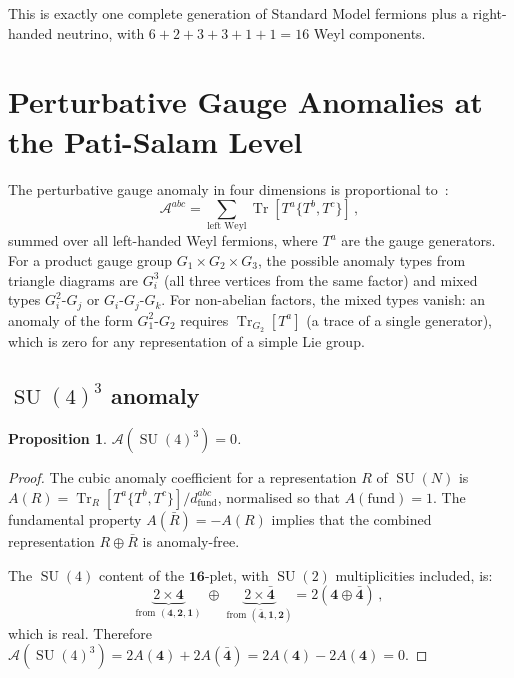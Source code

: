 \documentclass[12pt,a4paper]{article}
\newtheorem{proposition}[theorem]{Proposition}
\theoremstyle{definition}
\newcommand{\Tr}{\operatorname{Tr}}
\newcommand{\SU}{\operatorname{SU}}
\begin{document}
This is exactly one complete generation of Standard Model fermions plus a right-handed neutrino, with $6 + 2 + 3 + 3 + 1 + 1 = 16$ Weyl components.


\section{Perturbative Gauge Anomalies at the Pati-Salam Level}
\label{sec:PS_anomalies}

The perturbative gauge anomaly in four dimensions is proportional to~\cite{ABJ1969,GrossJackiw1972}:
\begin{equation}
\label{eq:anomaly_coeff}
\mathcal{A}^{abc} = \sum_{\text{left Weyl}} \Tr\!\left[T^a \{T^b, T^c\}\right]\,,
\end{equation}
summed over all left-handed Weyl fermions, where $T^a$ are the gauge generators.
For a product gauge group $G_1 \times G_2 \times G_3$, the possible anomaly types from triangle diagrams are $G_i^3$ (all three vertices from the same factor) and mixed types $G_i^2\text{-}G_j$ or $G_i\text{-}G_j\text{-}G_k$.
For non-abelian factors, the mixed types vanish: an anomaly of the form $G_1^2\text{-}G_2$ requires $\Tr_{G_2}[T^a]$ (a trace of a single generator), which is zero for any representation of a simple Lie group.

\subsection{$\SU(4)^3$ anomaly}

\begin{proposition}
\label{prop:su4_anomaly}
$\mathcal{A}(\SU(4)^3) = 0$.
\end{proposition}

\begin{proof}
The cubic anomaly coefficient for a representation $R$ of $\SU(N)$ is $A(R) = \Tr_R[T^a \{T^b, T^c\}] / d^{abc}_{\mathrm{fund}}$, normalised so that $A(\mathrm{fund}) = 1$.
The fundamental property $A(\bar{R}) = -A(R)$ implies that the combined representation $R \oplus \bar{R}$ is anomaly-free.

The $\SU(4)$ content of the $\mathbf{16}$-plet, with $\SU(2)$ multiplicities included, is:
\begin{equation}
\underbrace{2 \times \mathbf{4}}_{\text{from }(\mathbf{4},\mathbf{2},\mathbf{1})} \;\oplus\; \underbrace{2 \times \bar{\mathbf{4}}}_{\text{from }(\bar{\mathbf{4}},\mathbf{1},\mathbf{2})} = 2(\mathbf{4} \oplus \bar{\mathbf{4}})\,,
\end{equation}
which is real.
Therefore $\mathcal{A}(\SU(4)^3) = 2A(\mathbf{4}) + 2A(\bar{\mathbf{4}}) = 2A(\mathbf{4}) - 2A(\mathbf{4}) = 0$.
\end{proof}
\end{document}
